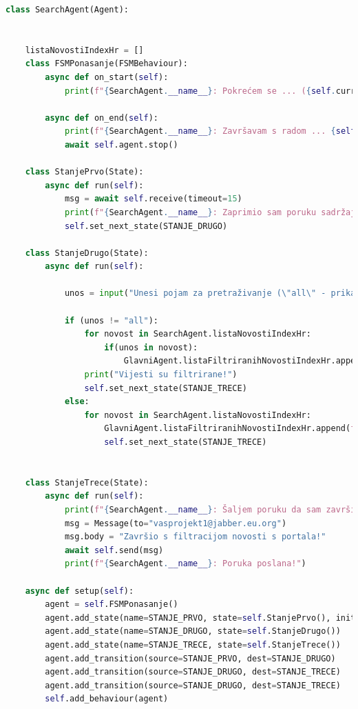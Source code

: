 \documentclass[]{foi} %
\begin{document}
\begin{lstlisting}[language=Python, caption={Programski kôd za SearchAgent agenta}]
class SearchAgent(Agent):


    listaNovostiIndexHr = []
    class FSMPonasanje(FSMBehaviour):
        async def on_start(self):
            print(f"{SearchAgent.__name__}: Pokrećem se ... ({self.current_state})")

        async def on_end(self):
            print(f"{SearchAgent.__name__}: Završavam s radom ... {self.current_state}")
            await self.agent.stop()

    class StanjePrvo(State):
        async def run(self):
            msg = await self.receive(timeout=15)
            print(f"{SearchAgent.__name__}: Zaprimio sam poruku sadržaja: \"{msg.body}\"")
            self.set_next_state(STANJE_DRUGO)
            
    class StanjeDrugo(State):
        async def run(self):
            
            unos = input("Unesi pojam za pretraživanje (\"all\" - prikaz svih vijesti): ")

            if (unos != "all"):
                for novost in SearchAgent.listaNovostiIndexHr:
                    if(unos in novost):
                        GlavniAgent.listaFiltriranihNovostiIndexHr.append(novost)
                print("Vijesti su filtrirane!")
                self.set_next_state(STANJE_TRECE)
            else:
                for novost in SearchAgent.listaNovostiIndexHr:
                    GlavniAgent.listaFiltriranihNovostiIndexHr.append(f"{novost}")
                    self.set_next_state(STANJE_TRECE)


    class StanjeTrece(State):
        async def run(self):
            print(f"{SearchAgent.__name__}: Šaljem poruku da sam završio s filtriranjem novosti ...")
            msg = Message(to="vasprojekt1@jabber.eu.org")
            msg.body = "Završio s filtracijom novosti s portala!"
            await self.send(msg)
            print(f"{SearchAgent.__name__}: Poruka poslana!")   

    async def setup(self):
        agent = self.FSMPonasanje()
        agent.add_state(name=STANJE_PRVO, state=self.StanjePrvo(), initial=True)
        agent.add_state(name=STANJE_DRUGO, state=self.StanjeDrugo())
        agent.add_state(name=STANJE_TRECE, state=self.StanjeTrece())
        agent.add_transition(source=STANJE_PRVO, dest=STANJE_DRUGO)
        agent.add_transition(source=STANJE_DRUGO, dest=STANJE_TRECE)
        agent.add_transition(source=STANJE_DRUGO, dest=STANJE_TRECE)
        self.add_behaviour(agent)
\end{lstlisting}
\end{document}
